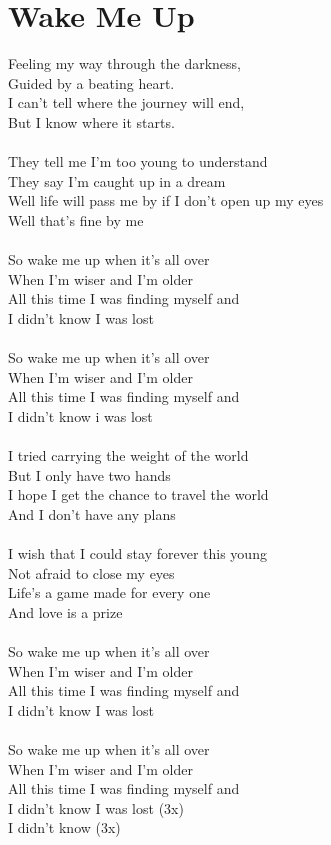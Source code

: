 \section{Wake Me Up}
Feeling my way through the darkness, \\
Guided by a beating heart.\\
I can't tell where the journey will end, \\
But I know where it starts.\\
\\
They tell me I'm too young to understand \\
They say I'm caught up in a dream \\
Well life will pass me by if I don't open up my eyes \\
Well that's fine by me\\
\\
So wake me up when it's all over \\
When I'm wiser and I'm older \\
All this time I was finding myself and \\
I didn't know I was lost\\
\\
So wake me up when it's all over \\
When I'm wiser and I'm older \\
All this time I was finding myself and \\
I didn't know i was lost\\
\\
I tried carrying the weight of the world \\
But I only have two hands \\
I hope I get the chance to travel the world \\
And I don't have any plans \\
\\
I wish that I could stay forever this young \\
Not afraid to close my eyes \\
Life's a game made for every one \\
And love is a prize\\
\\
So wake me up when it's all over \\
When I'm wiser and I'm older \\
All this time I was finding myself and \\
I didn't know I was lost\\
\\
So wake me up when it's all over \\
When I'm wiser and I'm older \\
All this time I was finding myself and \\
I didn't know I was lost (3x)\\
I didn't know (3x)\\